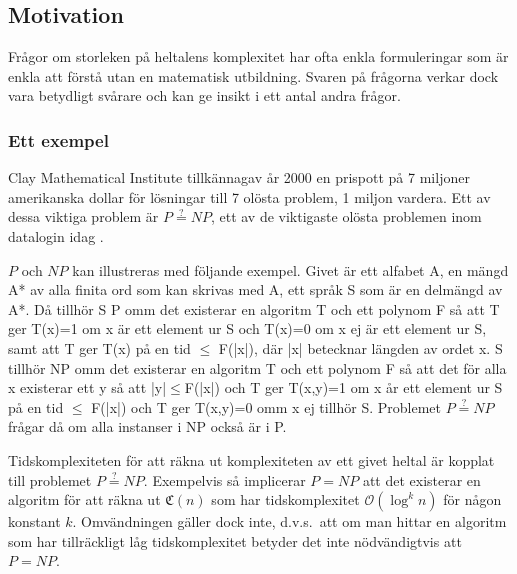 \documentclass[a4paper,titlepage]{article}
\newcommand{\C}[1]{\mathfrak C \left( #1 \right)}
\renewcommand{\O}{\mathcal {O}}
\theoremstyle{definition}
\begin{document}
	  \subsection{Motivation}
	
	Frågor om storleken på heltalens komplexitet har ofta enkla formuleringar som är enkla att 	förstå utan en matematisk utbildning.
    Svaren på frågorna verkar dock vara betydligt svårare och kan ge insikt i ett antal andra frågor.	
	
	\subsubsection{Ett exempel}


	Clay Mathematical Institute tillkännagav år 2000 en prispott på 7 miljoner amerikanska dollar
    för lösningar till 7 olösta problem, 1 miljon vardera. Ett av dessa viktiga
    problem är $P \stackrel{?}{=} NP$, ett av de viktigaste olösta problemen
    inom datalogin idag \cite{problem}.

		
	$P$ och $NP$ kan illustreras med följande exempel. 
	Givet är ett alfabet A,
	en mängd A* av alla finita ord som kan skrivas med A,
	ett språk S som är en delmängd av A*. Då
	tillhör S P omm det existerar en algoritm T och ett polynom F så att T ger T(x)=1 om x är ett element ur S och T(x)=0 om x ej är ett element ur S,
    samt att T ger T(x) på en tid 	$\le$ F(|x|), där |x| betecknar längden av ordet x.
	S tillhör NP omm det existerar en algoritm T och ett polynom F så att det för alla x existerar ett
    y så att |y|$\le$F(|x|) och T ger T(x,y)=1 om x år ett element ur S på en tid $\le$ F(|x|) och T
	ger T(x,y)=0 omm x ej tillhör S. Problemet $P \stackrel{?}{=} NP$ frågar då om alla instanser i NP också är i P.
    
    Tidskomplexiteten för att räkna ut komplexiteten av ett 
	givet heltal är kopplat till problemet $P \stackrel{?}{=} NP$.
    Exempelvis så implicerar $P = NP$ att det existerar en algoritm för
    att räkna ut $\C{n}$ som har tidskomplexitet $\O(\log^k n)$ 
    för någon konstant $k$. Omvändningen gäller dock inte, d.v.s.\
    att om man hittar en algoritm som har tillräckligt låg tidskomplexitet
    betyder det inte nödvändigtvis att $P=NP$.
	 
\end{document}
